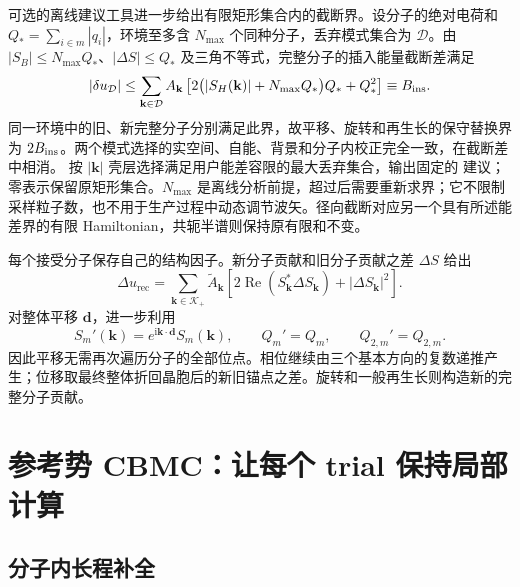 可选的离线建议工具进一步给出有限矩形集合内的截断界。设分子的绝对电荷和 $Q_*=\sum_{i\in m}|q_i|$，环境至多含 $N_{\max}$ 个同种分子，丢弃模式集合为 $\mathcal D$。由 $|S_B|\le N_{\max}Q_*$、$|\Delta S|\le Q_*$ 及三角不等式，完整分子的插入能量截断差满足
\begin{equation}
|\delta u_{\mathcal D}|
\le\sum_{\mathbf k\in\mathcal D} A_{\mathbf k}
\left[2\bigl(|S_H(\mathbf k)|+N_{\max}Q_*\bigr)Q_*+Q_*^2\right]
\equiv B_{\rm ins}.
\label{eq:06-tail-bound}
\end{equation}
同一环境中的旧、新完整分子分别满足此界，故平移、旋转和再生长的保守替换界为 $2B_{\rm ins}$。两个模式选择的实空间、自能、背景和分子内校正完全一致，在截断差中相消。 按 $|\mathbf k|$ 壳层选择满足用户能差容限的最大丢弃集合，输出固定的  建议；零表示保留原矩形集合。$N_{\max}$ 是离线分析前提，超过后需要重新求界；它不限制采样粒子数，也不用于生产过程中动态调节波矢。径向截断对应另一个具有所述能差界的有限 Hamiltonian，共轭半谱则保持原有限和不变。

每个接受分子保存自己的结构因子。新分子贡献和旧分子贡献之差 $\Delta S$ 给出
\begin{equation}
\Delta u_{\mathrm{rec}}
=\sum_{\mathbf k\in\mathcal K_+}\widetilde A_{\mathbf k}
\left[2\operatorname{Re}(S_{\mathbf k}^*\Delta S_{\mathbf k})+|\Delta S_{\mathbf k}|^2\right].
\label{eq:06-reciprocal-delta}
\end{equation}
对整体平移 $\mathbf d$，进一步利用
\begin{equation}
S_m'(\mathbf k)=e^{\mathrm i\mathbf k\cdot\mathbf d}S_m(\mathbf k),
\qquad Q_m'=Q_m,\qquad Q_{2,m}'=Q_{2,m}.
\label{eq:06-translation}
\end{equation}
因此平移无需再次遍历分子的全部位点。相位继续由三个基本方向的复数递推产生；位移取最终整体折回晶胞后的新旧锚点之差。旋转和一般再生长则构造新的完整分子贡献。

\section{参考势 CBMC：让每个 trial 保持局部计算}
\label{sec:06-reference-cbmc}

\subsection{分子内长程补全}

